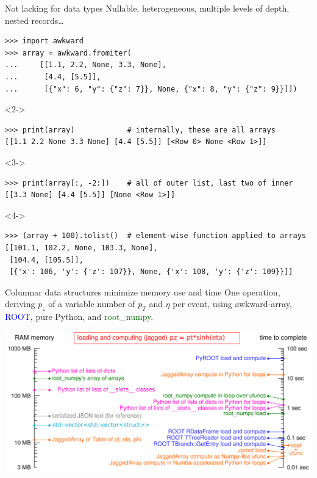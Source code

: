 \documentclass[aspectratio=169]{beamer}
\begin{document}
\begin{frame}[fragile]{Not lacking for data types}
\vspace{0.5 cm}
Nullable, heterogeneous, multiple levels of depth, nested records\ldots

\small
\begin{verbatim}
>>> import awkward
>>> array = awkward.fromiter(
...     [[1.1, 2.2, None, 3.3, None],
...      [4.4, [5.5]],
...      [{"x": 6, "y": {"z": 7}}, None, {"x": 8, "y": {"z": 9}}]])
\end{verbatim}

\begin{uncoverenv}<2->
\begin{verbatim}
>>> print(array)            # internally, these are all arrays
[[1.1 2.2 None 3.3 None] [4.4 [5.5]] [<Row 0> None <Row 1>]]
\end{verbatim}
\end{uncoverenv}

\begin{uncoverenv}<3->
\begin{verbatim}
>>> print(array[:, -2:])    # all of outer list, last two of inner
[[3.3 None] [4.4 [5.5]] [None <Row 1>]]
\end{verbatim}
\end{uncoverenv}

\begin{uncoverenv}<4->
\begin{verbatim}
>>> (array + 100).tolist()  # element-wise function applied to arrays
[[101.1, 102.2, None, 103.3, None],
 [104.4, [105.5]],
 [{'x': 106, 'y': {'z': 107}}, None, {'x': 108, 'y': {'z': 109}}]]
\end{verbatim}
\end{uncoverenv}
\end{frame}

\begin{frame}{Columnar data structures minimize memory use and time}
\vspace{0.5 cm}
One operation, deriving $p_z$ of a variable number of $p_T$ and $\eta$ per event, using \textcolor{darkorange2}{awkward-array}, \textcolor{blue}{ROOT}, \textcolor{darkpink}{pure Python}, and \textcolor{darkgreen}{root\_numpy}.

\vspace{0.2 cm}
\begin{center}
\includegraphics[width=0.9\linewidth]{logscales.pdf}
\end{center}
\end{frame}
\end{document}

